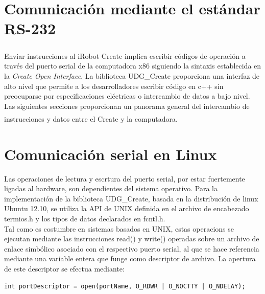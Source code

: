 \documentclass[letterpaper,openright,12pt]{book}
\begin{document}
\section{Comunicación mediante el estándar RS-232}
Enviar instrucciones al iRobot Create\textsuperscript{\textsuperscript{\textregistered}} implica escribir códigos de operación a través del puerto serial de la computadora x86 siguiendo la sintaxis establecida en la \emph{Create Open Interface}. La biblioteca UDG\_Create proporciona una interfaz de alto nivel que permite a los desarrolladores escribir código en c++ sin preocuparse por  especificaciones eléctricas o intercambio de datos a bajo nivel. Las siguientes secciones proporcionan un panorama general del intercambio de instrucciones y datos entre el Create\textsuperscript{\textsuperscript{\textregistered}} y la computadora.\\
\section{Comunicación serial en Linux}
Las operaciones de lectura y escrtura del puerto serial, por estar fuertemente ligadas al hardware, son dependientes del sistema operativo. Para la implementación de la biblioteca UDG\_Create, basada en la distribución de linux Ubuntu 12.10, se utiliza la API de UNIX definida en el archivo de encabezado termios.h y los tipos de datos declarados en fcntl.h.\\
Tal como es costumbre en sistemas basados en UNIX, estas operacions se ejecutan mediante las instrucciones read() y write() operadas sobre un archivo de enlace simbólico asociado con el respectivo puerto serial, al que se hace referencia mediante una variable entera que funge como descriptor de archivo. La apertura de este descriptor se efectua mediante:
\begin{lstlisting}
int portDescriptor = open(portName, O_RDWR | O_NOCTTY | O_NDELAY);
\end{lstlisting}
\end{document}
